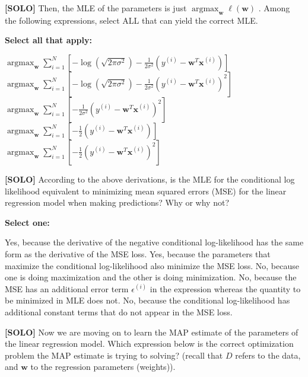 \documentclass[11pt,addpoints,answers]{exam}
\newcommand \argmax {\operatorname*{argmax}}
\newcommand{\solo}{\textbf{[SOLO]} }
\begin{document}
\begin{questions}
    
    \question[3] \solo Then, the MLE of the parameters is just  $\argmax_{\mathbf{w}} \ell(\mathbf{w})$ . Among the following expressions, select ALL that can yield the correct MLE. 

    \textbf{Select all that apply:}
    {\checkboxchar{$\Box$} \checkedchar{$\blacksquare$}
    \begin{checkboxes}
        \choice $\argmax_{\mathbf{w}} \sum_{i=1}^{N} [-\log (\sqrt{2\pi\sigma^2}) - \frac{1}{2\sigma^2} (y^{(i)} - \mathbf{w}^T\mathbf{x}^{(i)})]$
        \CorrectChoice $\argmax_{\mathbf{w}} \sum_{i=1}^{N} [-\log (\sqrt{2\pi\sigma^2}) - \frac{1}{2\sigma^2} (y^{(i)} - \mathbf{w}^T\mathbf{x}^{(i)})^2]$
        \CorrectChoice $\argmax_{\mathbf{w}} \sum_{i=1}^{N} [- \frac{1}{2\sigma^2} (y^{(i)} - \mathbf{w}^T\mathbf{x}^{(i)})^2]$
        \choice $\argmax_{\mathbf{w}} \sum_{i=1}^{N} [- \frac{1}{2} (y^{(i)} - \mathbf{w}^T\mathbf{x}^{(i)})]$
        \CorrectChoice $\argmax_{\mathbf{w}} \sum_{i=1}^{N} [- \frac{1}{2} (y^{(i)} - \mathbf{w}^T\mathbf{x}^{(i)})^2]$
    \end{checkboxes}
    }
    
    
    \question[3] \solo According to the above derivations, is the MLE for the conditional log likelihood equivalent to minimizing mean squared errors (MSE) for the linear regression model when making predictions? Why or why not? 

    \textbf{Select one:}
    \begin{checkboxes}
        \choice Yes, because the derivative of the negative conditional log-likelihood has the same form as the derivative of the MSE loss. 
        \CorrectChoice Yes, because the parameters that maximize the conditional log-likelihood also minimize the MSE loss.
        \choice No, because one is doing maximization and the other is doing minimization.
        \choice No, because the MSE has an additional error term $\epsilon^{(i)}$ in the expression whereas the quantity to be minimized in MLE does not. 
        \choice No, because the conditional log-likelihood has additional constant terms that do not appear in the MSE loss.
    \end{checkboxes}
    
    \question[3]\solo Now we are moving on to learn the MAP estimate of the parameters of the linear regression model. Which expression below is the correct optimization problem the MAP estimate is trying to solving? (recall that $D$ refers to the data, and $\mathbf{w}$ to the regression parameters (weights)).
    

\end{questions}
\end{document}
